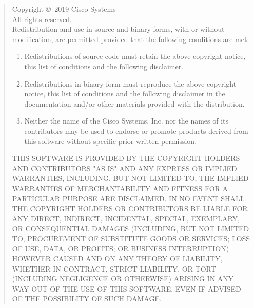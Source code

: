 \documentclass{book}
\begin{document}
\begin{quote}
Copyright \copyright \, 2019 Cisco Systems \\
All rights reserved. \\
 
Redistribution and use in source and binary forms, with or without
modification, are permitted provided that the following conditions are
met:
\begin{enumerate}
  \item Redistributions of source code must retain the above copyright
    notice, this list of conditions and the following disclaimer.
 
  \item Redistributions in binary form must reproduce the above
   copyright notice, this list of conditions and the following
   disclaimer in the documentation and/or other materials provided
   with the distribution.
 
   \item Neither the name of the Cisco Systems, Inc. nor the names of its
   contributors may be used to endorse or promote products derived
   from this software without specific prior written permission.
\end{enumerate}
   
 THIS SOFTWARE IS PROVIDED BY THE COPYRIGHT HOLDERS AND CONTRIBUTORS
 "AS IS" AND ANY EXPRESS OR IMPLIED WARRANTIES, INCLUDING, BUT NOT
 LIMITED TO, THE IMPLIED WARRANTIES OF MERCHANTABILITY AND FITNESS
 FOR A PARTICULAR PURPOSE ARE DISCLAIMED. IN NO EVENT SHALL THE
 COPYRIGHT HOLDERS OR CONTRIBUTORS BE LIABLE FOR ANY DIRECT,
 INDIRECT, INCIDENTAL, SPECIAL, EXEMPLARY, OR CONSEQUENTIAL DAMAGES
 (INCLUDING, BUT NOT LIMITED TO, PROCUREMENT OF SUBSTITUTE GOODS OR
 SERVICES; LOSS OF USE, DATA, OR PROFITS; OR BUSINESS INTERRUPTION)
 HOWEVER CAUSED AND ON ANY THEORY OF LIABILITY, WHETHER IN CONTRACT,
 STRICT LIABILITY, OR TORT (INCLUDING NEGLIGENCE OR OTHERWISE)
 ARISING IN ANY WAY OUT OF THE USE OF THIS SOFTWARE, EVEN IF ADVISED
 OF THE POSSIBILITY OF SUCH DAMAGE.

\end{quote}

%
\end{document}

